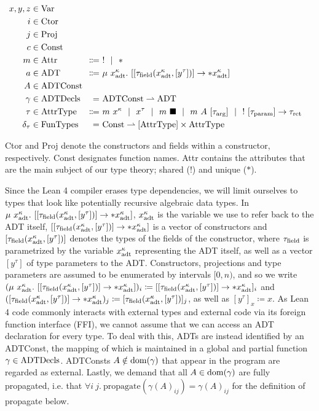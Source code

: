 \begin{alignat*}{2}
  x, y, z &\in \Var \\
  i &\in \Ctor \\
  j &\in \Proj \\
  c &\in \Const \\
  m &\in \Attr &\Coloneqq&\ ! \sep * \\
  a &\in \ADT &\Coloneqq&\ \mu\ x^\kappa_\adt.\ [[\tau_\field(x^\kappa_\adt, [y^\tau])] \to *x^\kappa_\adt] \\
  A &\in \mathrlap{\ADTConst} \\
  \gamma &\in \ADTDecls &=&\ \ADTConst \rightharpoonup \ADT \\
  \tau &\in \AttrType &\Coloneqq&\ m\ x^\kappa \sep x^\tau \sep m\ \blacksquare \sep m\ A\ [\tau_\arrg] \sep !\ [\tau_\param] \to \tau_\ret \\
  \delta_\tau &\in \FunTypes &=&\ \Const \rightharpoonup [\AttrType] \times \AttrType
\end{alignat*}

Ctor and Proj denote the constructors and fields within a constructor, respectively. Const designates function names. Attr contains the attributes that are the main subject of our type theory; shared (!) and unique ($*$). 

\sloppy Since the Lean 4 compiler erases type dependencies, we will limit ourselves to types that look like potentially recursive algebraic data types. In $\mu\ x^\kappa_\adt.\ [[\tau_\field(x^\kappa_\adt, [y^\tau])] \to *x^\kappa_\adt]$, $x^\kappa_{\mathrm{adt}}$ is the variable we use to refer back to the ADT itself, $[[\tau_{\mathrm{field}}(x^\kappa_{\mathrm{adt}}, [y^\tau])] \to *x^\kappa_{\mathrm{adt}}]$ is a vector of constructors and $[\tau_{\mathrm{field}}(x^\kappa_{\mathrm{adt}}, [y^\tau])]$ denotes the types of the fields of the constructor, where $\tau_{\mathrm{field}}$ is parametrized by the variable $x^\kappa_{\mathrm{adt}}$ representing the ADT itself, as well as a vector $[y^\tau]$ of type parameters to the ADT. Constructors, projections and type parameters are assumed to be enumerated by intervals $[0, n)$, and so we write $(\mu\ x^\kappa_\adt.\ [[\tau_\field(x^\kappa_\adt, [y^\tau])] \to *x^\kappa_\adt])_i \coloneqq [[\tau_\field(x^\kappa_\adt, [y^\tau])] \to *x^\kappa_\adt]_i$ and $([\tau_{\mathrm{field}}(x^\kappa_{\mathrm{adt}}, [y^\tau])] \to *x^\kappa_{\mathrm{adt}})_j \coloneqq [\tau_{\mathrm{field}}(x^\kappa_{\mathrm{adt}}, [y^\tau])]_j$, as well as $[y^\tau]_x \coloneqq x$. As Lean 4 code commonly interacts with external types and external code via its foreign function interface (FFI), we cannot assume that we can access an ADT declaration for every type. To deal with this, ADTs are instead identified by an ADTConst, the mapping of which is maintained in a global and partial function $\gamma \in \mathrm{ADTDecls}$. ADTConsts $A \notin \mathrm{dom}(\gamma)$ that appear in the program are regarded as external. Lastly, we demand that all $A \in \mathrm{dom}(\gamma)$ are fully propagated, i.e. that $\forall i\ j.\ \mathrm{propagate}(\gamma(A)_{ij}) = \gamma(A)_{ij}$ for the definition of propagate below.

